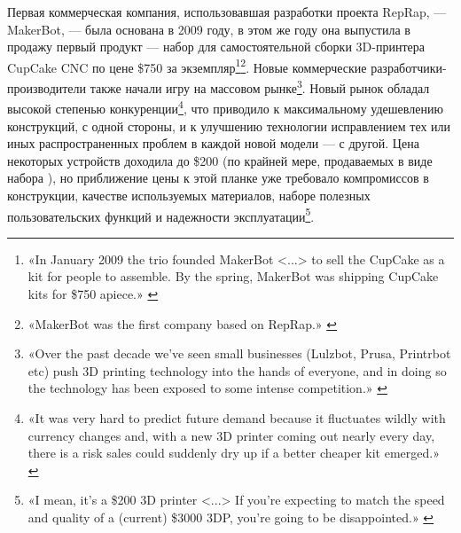 \documentclass{article}
\begin{document}
Первая коммерческая компания, использовавшая разработки проекта RepRap, — MakerBot, — была основана в 2009 году, в этом же году она выпустила в продажу первый продукт — набор для самостоятельной сборки 3D-принтера CupCake CNC \cite{thingiverseCupCakeCnc2009} по цене \$750 за экземпляр\footnote{«In January 2009 the trio founded MakerBot <...> to sell the CupCake as a kit for people to assemble. By the spring, MakerBot was shipping CupCake kits for \$750 apiece.» \cite{wiredMakerbot2016}}\footnote{«MakerBot was the first company based on RepRap.» \cite{rrOfficialHistory2016}}. Новые коммерческие разработчики-производители также начали игру на массовом рынке\footnote{«Over the past decade we’ve seen small businesses (Lulzbot, Prusa, Printrbot etc) push 3D printing technology into the hands of everyone, and in doing so the technology has been exposed to some intense competition.» \cite{rrAnniversaryIntervieEdSells2018}}. Новый рынок обладал высокой степенью конкуренции\footnote{«It was very hard to predict future demand because it fluctuates wildly with currency changes and, with a new 3D printer coming out nearly every day, there is a risk sales could suddenly dry up if a better cheaper kit emerged.» \cite{rrChrisPalmerEndGame2015}}, что приводило к максимальному удешевлению конструкций, с одной стороны, и к улучшению технологии исправлением тех или иных распространенных проблем в каждой новой модели — с другой. Цена некоторых устройств доходила до \$200 (по крайней мере, продаваемых в виде набора \cite{geekdadOneUp2014}), но приближение цены к этой планке уже требовало компромиссов в конструкции, качестве используемых материалов, наборе полезных пользовательских функций и надежности эксплуатации\footnote{«I mean, it’s a \$200 3D printer <...> If you’re expecting to match the speed and quality of a (current) \$3000 3DP, you’re going to be disappointed.» \cite{geekdadOneUp2014}}.
\end{document}
